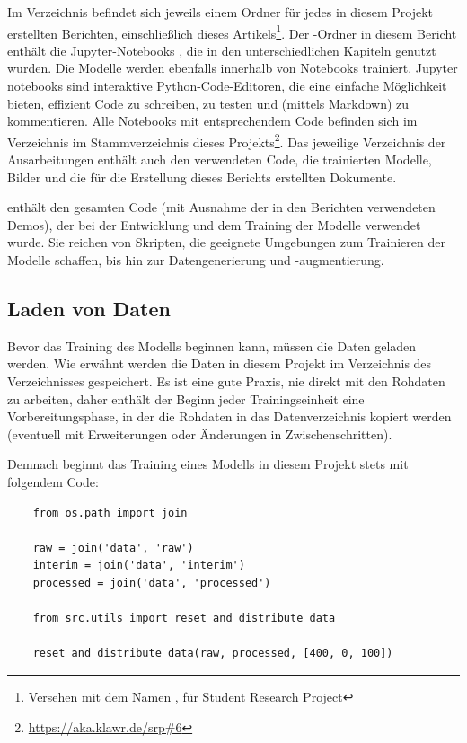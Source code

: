 Im  Verzeichnis befindet sich jeweils einem Ordner für jedes in diesem Projekt erstellten Berichten, einschließlich dieses Artikels\footnote{Versehen mit dem Namen , für Student Research Project}.
Der -Ordner in diesem Bericht enthält die Jupyter-Notebooks \cite{Jupyter2019}, die in den unterschiedlichen Kapiteln genutzt wurden.
Die Modelle werden ebenfalls innerhalb von  Notebooks trainiert. 
Jupyter notebooks sind interaktive Python-Code-Editoren, die eine einfache Möglichkeit bieten, effizient Code zu schreiben, zu testen und (mittels Markdown) zu kommentieren.
Alle Notebooks mit entsprechendem Code befinden sich im Verzeichnis  im Stammverzeichnis dieses Projekts\footnote{\url{https://aka.klawr.de/srp\#6}}.
Das jeweilige Verzeichnis der Ausarbeitungen enthält auch den verwendeten Code, die trainierten Modelle, Bilder und die für die Erstellung dieses Berichts erstellten Dokumente.

 enthält den gesamten Code (mit Ausnahme der in den Berichten verwendeten Demos), der bei der Entwicklung und dem Training der Modelle verwendet wurde. Sie reichen von Skripten, die geeignete Umgebungen zum Trainieren der Modelle schaffen, bis hin zur Datengenerierung und -augmentierung.

\subsection{Laden von Daten}

Bevor das Training des Modells beginnen kann, müssen die Daten geladen werden.
Wie erwähnt werden die Daten in diesem Projekt im Verzeichnis  des Verzeichnisses  gespeichert.
Es ist eine gute Praxis, nie direkt mit den Rohdaten zu arbeiten, daher enthält der Beginn jeder Trainingseinheit eine Vorbereitungsphase, in der die Rohdaten in das  Datenverzeichnis kopiert werden (eventuell mit Erweiterungen oder Änderungen in Zwischenschritten).

Demnach beginnt das Training eines Modells in diesem Projekt stets mit folgendem Code:

\begin{lstlisting}
    from os.path import join
    
    raw = join('data', 'raw')
    interim = join('data', 'interim')
    processed = join('data', 'processed')
        
    from src.utils import reset_and_distribute_data
        
    reset_and_distribute_data(raw, processed, [400, 0, 100])
\end{lstlisting}

